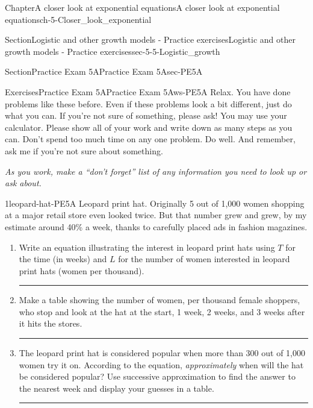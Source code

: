 \documentclass[twoside,11pt,]{book}
\newlength{\workspacestrutwidth}
\numberwithin{equation}{section}
\begin{document}
\begin{chapterptx}{Chapter}{A closer look at exponential equations}{}{A closer look at exponential equations}{}{}{ch-5-Closer_look_exponential}
\begin{sectionptx}{Section}{Logistic and other growth models - Practice exercises}{}{Logistic and other growth models - Practice exercises}{}{}{sec-5-5-Logistic_growth}
\end{sectionptx}
%
%
\typeout{************************************************}
\typeout{************************************************}
%
\begin{sectionptx}{Section}{Practice Exam 5A}{}{Practice Exam 5A}{}{}{sec-PE5A}
%
%
\typeout{************************************************}
\typeout{************************************************}
%
\begin{exercises-subsection-numberless}{Exercises}{Practice Exam 5A}{}{Practice Exam 5A}{}{}{ws-PE5A}
Relax. You have done problems like these before. Even if these problems look a bit different, just do what you can. If you're not sure of something, please ask! You may use your calculator. Please show all of your work and write down as many steps as you can. Don't spend too much time on any one problem. Do well. And remember, ask me if you're not sure about something.%
 \par
\emph{As you work, make a ``don't forget'' list of any information you need to look up or ask about.}%
 \begin{divisionexercise}{1}{}{}{leopard-hat-PE5A}%
Leopard print hat. Originally 5 out of 1,000 women shopping at a major retail store even looked twice. But that number grew and grew, by my estimate around 40\% a week, thanks to carefully placed ads in fashion magazines.%
\begin{enumerate}[label=(\alph*),ref=\alph*]%
\item{}Write an equation illustrating the interest in leopard print hats using \(T\) for the time (in weeks) and \(L\) for the number of women interested in leopard print hats (women per thousand).%
\par\rule{\workspacestrutwidth}{0.5in}%
\item{}Make a table showing the number of women, per thousand female shoppers, who stop and look at the hat at the start, 1 week, 2 weeks, and 3 weeks after it hits the stores.%
\par\rule{\workspacestrutwidth}{0.5in}%
\item{}The leopard print hat is considered popular when more than 300 out of 1,000 women try it on. According to the equation, \emph{approximately} when will the hat be considered popular? Use successive approximation to find the answer to the nearest week and display your guesses in a table.%
\par\rule{\workspacestrutwidth}{0.75in}%

\end{enumerate}
\end{divisionexercise}
\end{exercises-subsection-numberless}
\end{sectionptx}
\end{chapterptx}
\end{document}

